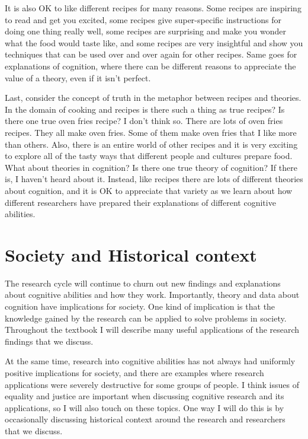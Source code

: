 \documentclass[
  oneside,
  12pt]{crumpbook}
\begin{document}
It is also OK to like different recipes for many reasons. Some recipes are inspiring to read and get you excited, some recipes give super-specific instructions for doing one thing really well, some recipes are surprising and make you wonder what the food would taste like, and some recipes are very insightful and show you techniques that can be used over and over again for other recipes. Same goes for explanations of cognition, where there can be different reasons to appreciate the value of a theory, even if it isn't perfect.

Last, consider the concept of truth in the metaphor between recipes and theories. In the domain of cooking and recipes is there such a thing as true recipes? Is there one true oven fries recipe? I don't think so. There are lots of oven fries recipes. They all make oven fries. Some of them make oven fries that I like more than others. Also, there is an entire world of other recipes and it is very exciting to explore all of the tasty ways that different people and cultures prepare food. What about theories in cognition? Is there one true theory of cognition? If there is, I haven't heard about it. Instead, like recipes there are lots of different theories about cognition, and it is OK to appreciate that variety as we learn about how different researchers have prepared their explanations of different cognitive abilities.

\hypertarget{society-and-historical-context}{%
\section{Society and Historical context}\label{society-and-historical-context}}

The research cycle will continue to churn out new findings and explanations about cognitive abilities and how they work. Importantly, theory and data about cognition have implications for society. One kind of implication is that the knowledge gained by the research can be applied to solve problems in society. Throughout the textbook I will describe many useful applications of the research findings that we discuss.

At the same time, research into cognitive abilities has not always had uniformly positive implications for society, and there are examples where research applications were severely destructive for some groups of people. I think issues of equality and justice are important when discussing cognitive research and its applications, so I will also touch on these topics. One way I will do this is by occasionally discussing historical context around the research and researchers that we discuss.
\end{document}
